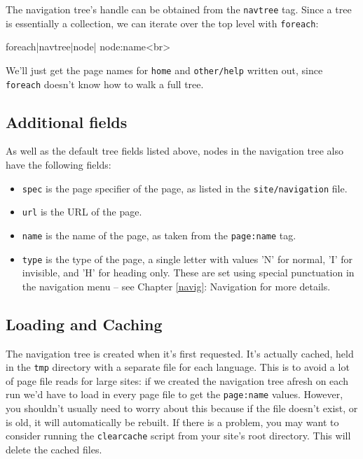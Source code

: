 The navigation tree's handle can be obtained from the \texttt{navtree} tag.
Since a tree is essentially a collection, we can iterate over the top level
with \texttt{foreach}:
\begin{MyVerbatim}
{{foreach|{{navtree}}|node|
    {{node:name}}<br>
    }}
\end{MyVerbatim}
We'll just get the page names for \texttt{home} and \texttt{other/help}
written out, since \texttt{foreach} doesn't know how to walk a full tree.

\subsection{Additional fields}
As well as the default tree fields listed above, nodes in the navigation tree also have the following fields:
\begin{itemize}
\item \texttt{spec} is the page specifier of the page, as listed in the \texttt{site/navigation} file.
\item \texttt{url} is the URL of the page.
\item \texttt{name} is the name of the page, as taken from the \texttt{page:name} tag.
\item \texttt{type} is the type of the page, a single letter with values 'N' for normal, 'I' for invisible,
and 'H' for heading only. These are set using special punctuation in the navigation menu -- see Chapter \ref{navig}: Navigation
for more details.
\end{itemize}

\subsection{Loading and Caching}
The navigation tree is created when it's first requested. It's actually
cached, held in the \texttt{tmp} directory with a separate file for each
language. This is to avoid a lot of page file reads for large sites: if we
created the navigation tree afresh on each run we'd have to load in every page
file to get the \texttt{page:name} values. However, you shouldn't usually need
to worry about this because if the file doesn't exist, or is old, it will
automatically be rebuilt. If there is a problem, you may want to consider
running the \texttt{clearcache} script from your site's root directory. This
will delete the cached files.

